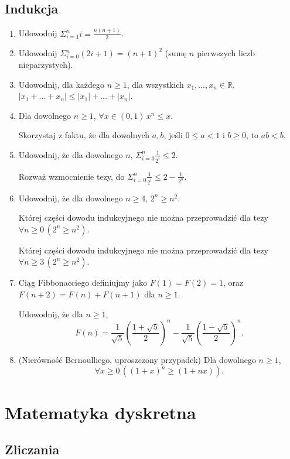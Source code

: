 \documentclass[12pt]{article}
\newcommand{\bR}{\mathbb{R}}
\begin{document}
\subsection{Indukcja}\label{ss:indukcja}
\begin{enumerate}
    \item Udowodnij $\Sigma_{i=1}^n i = \frac{n(n+1)}{2}$. 
    \item Udowodnij $\Sigma_{i=0}^n (2i+1) = (n+1)^2$
           (sumę $n$ pierwszych liczb nieparzystych).
    \item Udowodnij, dla każdego $n\geq 1$, dla wszystkich $x_1,\dots, x_n\in \bR$, $|x_1 + ... + x_n| \leq  |x_1| + ... + |x_n|$.
\item 
Dla dowolnego  $n\geq 1$, $\forall x \in (0,1)\, x^n \leq  x$.

Skorzystaj z faktu, że dla dowolnych $a,b$, jeśli $0\leq a < 1$ i $b\geq 0$, to $ab<b$.

\item 
Udowodnij, że dla dowolnego $n$, $\Sigma_{i=0}^n \frac{1}{2^i} \leq 2$.

Rozważ wzmocnienie  tezy, 
do $\Sigma_{i=0}^n \frac{1}{2^i} \leq 2-\frac{1}{2^{n}}$.

\item \label{ind:2nn2} Udowodnij, że dla dowolnego $n\geq 4$, $2^n\geq  n^2$.

Której części dowodu indukcyjnego nie można przeprowadzić 
dla tezy $\forall n\geq 0\, (2^n\geq n^2)$.

Której części dowodu indukcyjnego nie można przeprowadzić 
dla tezy $\forall n\geq 3\, (2^n\geq n^2)$.

\item Ciąg Fibbonacciego definiujmy jako 
$F(1)=F(2)=1$, oraz $F(n+2)=F(n)+F(n+1)$ dla $n\geq 1$.


Udowodnij, że dla $n\geq 1$, 
$$
F(n)=\frac{1}{\sqrt{5}}\left(\frac{1+\sqrt{5}}{2}\right)^n- 
    \frac{1}{\sqrt{5}}\left(\frac{1-\sqrt{5}}{2}\right)^n.
$$

\item 
(Nierówność  Bernoulliego,  uproszczony przypadek) Dla dowolnego $n\geq 1$, 
\[
\forall x \geq 0\, ((1+x)^n \geq (1+nx)).
\]

\end{enumerate}

\section{Matematyka dyskretna}
\subsection{Zliczania}
\end{document}
